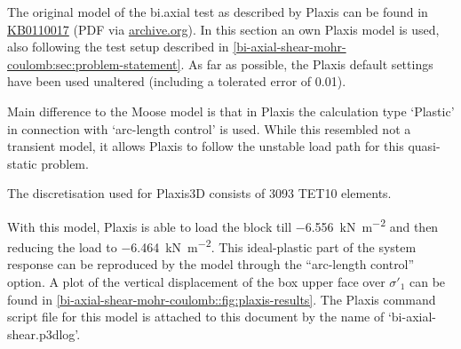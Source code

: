 The original model of the bi.axial test as described by Plaxis can be found in
\href{https://bentleysystems.service-now.com/community?id=kb\_article\_view&sysparm_article=KB0110017}{KB0110017}
(PDF via
\href{https://web.archive.org/web/20230926091632/https://communities.bentley.com/cfs-file/\_\_key/communityserver-wikis-components-files/00-00-00-05-58/PlxValidation\_2D00\_Bi\_2D00\_axial\_5F00\_compression\_5F00\_test\_5F00\_with\_5F00\_Mohr\_2D00\_Coulomb\_5F00\_model\_2D00\_2018.pdf}{archive.org}).
In this section an own Plaxis model is used, also following the test setup
described in \autoref{bi-axial-shear-mohr-coulomb:sec:problem-statement}. As
far as possible, the Plaxis default settings have been used unaltered
(including a tolerated error of \qty{0.01}{}).

Main difference to the Moose model is that in Plaxis the calculation type
‘Plastic’ in connection with ‘arc-length control’ is used. While this resembled
not a transient model, it allows Plaxis to follow the unstable load path for
this quasi-static problem.

The discretisation used for Plaxis3D consists of 3093 TET10 elements.

With this model, Plaxis is able to load the block till
\qty{-6.556}{\kilo\newton\per\square\metre} and then reducing the load to
\qty{-6.464}{\kilo\newton\per\square\metre}. This ideal-plastic part of the
system response can be reproduced by the model through the “arc-length control”
option. A plot of the vertical displacement of the box upper face over
$\sigma'_1$ can be found in
\autoref{bi-axial-shear-mohr-coulomb::fig:plaxis-results}. The Plaxis command
script file for this model is attached to this document by the name of
‘bi-axial-shear.p3dlog’.


